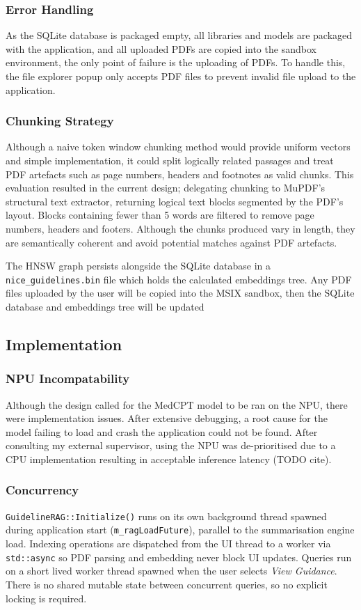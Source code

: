 \subsubsection{Error Handling}
As the SQLite database is packaged empty, all libraries and models are packaged with the application, and all uploaded PDFs are copied into the sandbox environment, the only point of failure is the uploading of PDFs. To handle this, the file explorer popup only accepts PDF files to prevent invalid file upload to the application.

\subsubsection{Chunking Strategy}
Although a naive token window chunking method would provide uniform vectors and simple implementation, it could split logically related passages and treat PDF artefacts such as page numbers, headers and footnotes as valid chunks. This evaluation resulted in the current design; delegating chunking to MuPDF's structural text extractor, returning logical text blocks segmented by the PDF's layout. Blocks containing fewer than 5 words are filtered to remove page numbers, headers and footers. Although the chunks produced vary in length, they are semantically coherent and avoid potential matches against PDF artefacts.

The HNSW graph persists alongside the SQLite database in a \texttt{nice\_guidelines.bin} file which holds the calculated embeddings tree. Any PDF files uploaded by the user will be copied into the MSIX sandbox, then the SQLite database and embeddings tree will be updated

\subsection{Implementation}
\subsubsection{NPU Incompatability}
Although the design called for the MedCPT model to be ran on the NPU, there were implementation issues. After extensive debugging, a root cause for the model failing to load and crash the application could not be found. After consulting my external supervisor, using the NPU was de-prioritised due to a CPU implementation resulting in acceptable inference latency (TODO cite).

\subsubsection{Concurrency}
\texttt{GuidelineRAG::Initialize()} runs on its own background thread spawned during application start (\texttt{m\_ragLoadFuture}), parallel to the summarisation engine load. Indexing operations are dispatched from the UI thread to a worker via \texttt{std::async} so PDF parsing and embedding never block UI updates. Queries run on a short lived worker thread spawned when the user selects \emph{View Guidance}. There is no shared mutable state between concurrent queries, so no explicit locking is required.

